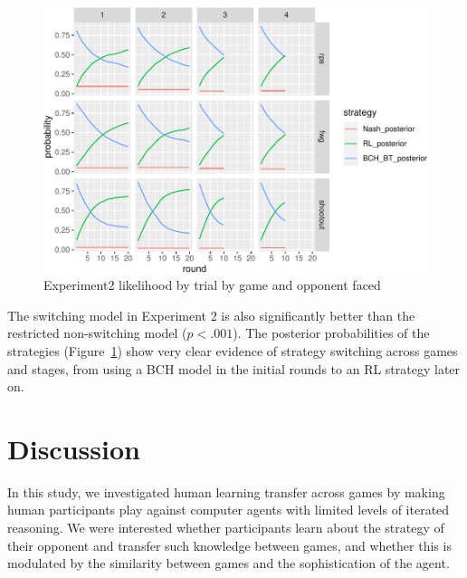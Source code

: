 \documentclass[
  english,
  man,floatsintext]{apa6}
\begin{document}
\begin{figure}

{\centering \includegraphics{paper_draft_2021_files/figure-latex/exp2-posteriors-plot-1} 

}

\caption{Experiment2 likelihood by trial by game and opponent faced}\label{fig:exp2-posteriors-plot}
\end{figure}

The switching model in Experiment 2 is also significantly better than the restricted non-switching model (\(p < .001\)). The posterior probabilities of the strategies (Figure~\ref{fig:exp2-posteriors-plot}) show very clear evidence of strategy switching across games and stages, from using a BCH model in the initial rounds to an RL strategy later on.

\hypertarget{discussion-2}{%
\section{Discussion}\label{discussion-2}}

In this study, we investigated human learning transfer across games by making human participants play against computer agents with limited levels of iterated reasoning. We were interested whether participants learn about the strategy of their opponent and transfer such knowledge between games, and whether this is modulated by the similarity between games and the sophistication of the agent.
\end{document}
